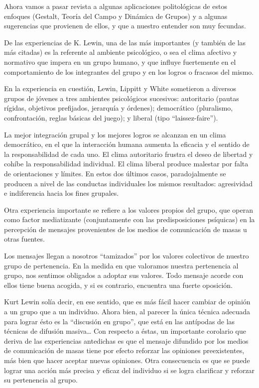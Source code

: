 \documentclass[
]{book}
\begin{document}
Ahora vamos a pasar revista a algunas aplicaciones politológicas de estos enfoques (Gestalt, Teoría del Campo y Dinámica de Grupos) y a algunas sugerencias que provienen de ellos, y que a nuestro entender son muy fecundas.

De las experiencias de K. Lewin, una de las más importantes (y también de las más citadas) es la referente al ambiente psicológico, o sea el clima afectivo y normativo que impera en un grupo humano, y que influye fuertemente en el comportamiento de los integrantes del grupo y en los logros o fracasos del mismo.

En la experiencia en cuestión, Lewin, Lippitt y White sometieron a diversos grupos de jóvenes a tres ambientes psicológicos sucesivos: autoritario (pautas rígidas, objetivos prefijados, jerarquía y órdenes); democrático (pluralismo, confrontación, reglas básicas del juego); y liberal (tipo ``laissez-faire'').

La mejor integración grupal y los mejores logros se alcanzan en un clima democrático, en el que la interacción humana aumenta la eficacia y el sentido de la responsabilidad de cada uno. El clima autoritario frustra el deseo de libertad y cohíbe la responsabilidad individual. El clima liberal produce malestar por falta de orientaciones y límites. En estos dos últimos casos, paradojalmente se producen a nivel de las conductas individuales los mismos resultados: agresividad e indiferencia hacia los fines grupales.

Otra experiencia importante se refiere a los valores propios del grupo, que operan como factor mediatizante (conjuntamente con las predisposiciones psíquicas) en la percepción de mensajes provenientes de los medios de comunicación de masas u otras fuentes.

Los mensajes llegan a nosotros ``tamizados'' por los valores colectivos de nuestro grupo de pertenencia. En la medida en que valoramos nuestra pertenencia al grupo, nos sentimos obligados a adoptar sus valores. Todo mensaje acorde con ellos tiene buena acogida, y si es contrario, encuentra una fuerte oposición.

Kurt Lewin solía decir, en ese sentido, que es más fácil hacer cambiar de opinión a un grupo que a un individuo. Ahora bien, al parecer la única técnica adecuada para lograr ésto es la ``discusión en grupo'', que está en las antípodas de las técnicas de difusión masiva\ldots{} Con respecto a éstas, un importante corolario que deriva de las experiencias antedichas es que el mensaje difundido por los medios de comunicación de masas tiene por efecto reforzar las opiniones preexistentes, más bien que hacer aceptar nuevas opiniones. Otra consecuencia es que se puede lograr una acción más precisa y eficaz del individuo si se logra clarificar y reforzar su pertenencia al grupo.
\end{document}
